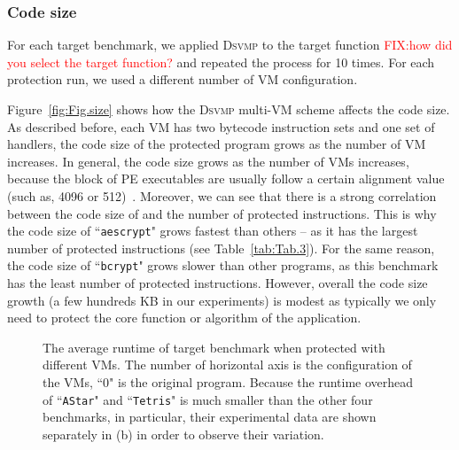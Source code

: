 \documentclass[preprint,12pt,3p]{elsarticle}
\newcommand{\DSVMP}{\textsc{Dsvmp}\xspace}
\newcommand\FIXME[1]{\textcolor{red}{FIX:}\textcolor{red}{#1}}
\begin{document}
\subsubsection{Code size} 
For each target benchmark, we applied \DSVMP to the target function \FIXME{how did you select the target function?} and repeated the process for 10 times.
For each protection run, we used a different number of VM configuration.

Figure~\ref{fig:Fig.size} shows how the \DSVMP multi-VM scheme affects the code size.
As described before, each VM has two bytecode instruction sets and one set of handlers,
the code size of the protected program grows as the number of VM increases.
In general, the code size grows as the number of VMs increases, because the block of PE executables
are usually follow a certain alignment value (such as, 4096 or 512)~\cite{pe}.
Moreover, we can see that there is a strong correlation between the code size of and the number of protected instructions.
This is why the code size of ``\texttt{aescrypt}" grows fastest than others -- as it has
the largest number of protected instructions (see Table~\ref{tab:Tab.3}).
For the same reason, the code size of ``\texttt{bcrypt}" grows slower than other programs,
as this benchmark has the least number of protected instructions.
However, overall the code size growth (a few hundreds KB in our experiments) is modest as typically we only need 
to protect the core function or algorithm of the application. 

\begin{figure}[t]
\centering
{}
\caption{The average runtime of target benchmark when protected with different VMs. The number of horizontal axis is the configuration of the VMs, ``0" is the original program. Because the runtime overhead of ``\texttt{AStar}" and ``\texttt{Tetris}" is much smaller than the other four benchmarks, in particular, their experimental data are shown separately in (b) in order to observe their variation.}\label{fig:Fig.time}
\end{figure}
\end{document}
